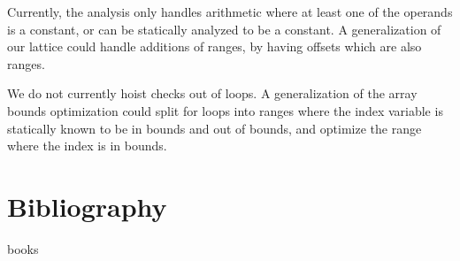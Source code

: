 \documentclass[11pt]{article}
\begin{document}
Currently, the analysis only handles arithmetic where at least one of the operands is
a constant, or can be statically analyzed to be a constant. A generalization of our
lattice could handle additions of ranges, by having offsets which are also ranges.

We do not currently hoist checks out of loops. A generalization of the array bounds optimization
could split for loops into ranges where the index variable is statically known to be in bounds and
out of bounds, and optimize the range where the index is in bounds.

\section{Bibliography}

books
\end{document}
